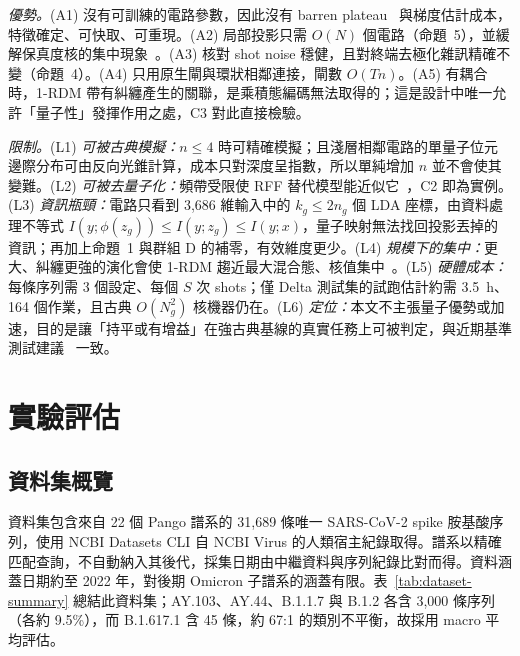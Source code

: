 \documentclass[10pt,a4paper]{article}
\begin{document}
\textit{優勢。}(A1) 沒有可訓練的電路參數，因此沒有 barren plateau~\cite{mcclean2018barren} 與梯度估計成本，特徵確定、可快取、可重現。(A2) 局部投影只需 $O(N)$ 個電路（命題~5），並緩解保真度核的集中現象~\cite{huang2021power}。(A3) 核對 shot noise 穩健，且對終端去極化雜訊精確不變（命題~4）。(A4) 只用原生閘與環狀相鄰連接，閘數 $O(Tn)$。(A5) 有耦合時，1-RDM 帶有糾纏產生的關聯，是乘積態編碼無法取得的；這是設計中唯一允許「量子性」發揮作用之處，C3 對此直接檢驗。

\textit{限制。}(L1) \emph{可被古典模擬：}$n\le4$ 時可精確模擬；且淺層相鄰電路的單量子位元邊際分布可由反向光錐計算，成本只對深度呈指數，所以單純增加 $n$ 並不會使其變難。(L2) \emph{可被去量子化：}頻帶受限使 RFF 替代模型能近似它~\cite{schreiber2023surrogates,sweke2023rff}，C2 即為實例。(L3) \emph{資訊瓶頸：}電路只看到 3,686 維輸入中的 $k_g\le2n_g$ 個 LDA 座標，由資料處理不等式 $I(y;\phi(z_g))\le I(y;z_g)\le I(y;x)$，量子映射無法找回投影丟掉的資訊；再加上命題~1 與群組 D 的補零，有效維度更少。(L4) \emph{規模下的集中：}更大、糾纏更強的演化會使 1-RDM 趨近最大混合態、核值集中~\cite{thanasilp2024concentration}。(L5) \emph{硬體成本：}每條序列需 3 個設定、每個 $S$ 次 shots；僅 Delta 測試集的試跑估計約需 3.5~h、164 個作業，且古典 $O(N_g^2)$ 核機器仍在。(L6) \emph{定位：}本文不主張量子優勢或加速，目的是讓「持平或有增益」在強古典基線的真實任務上可被判定，與近期基準測試建議~\cite{bowles2024better} 一致。

\FloatBarrier
\section{實驗評估}
\label{sec:experiment}

\subsection{資料集概覽}
\label{sec:dataset}

資料集包含來自 22 個 Pango 譜系的 31,689 條唯一 SARS-CoV-2 spike 胺基酸序列，使用 NCBI Datasets CLI 自 NCBI Virus 的人類宿主紀錄取得。譜系以精確匹配查詢，不自動納入其後代，採集日期由中繼資料與序列紀錄比對而得。資料涵蓋日期約至 2022 年，對後期 Omicron 子譜系的涵蓋有限。表~\ref{tab:dataset-summary} 總結此資料集；AY.103、AY.44、B.1.1.7 與 B.1.2 各含 3,000 條序列（各約 9.5\%），而 B.1.617.1 含 45 條，約 67:1 的類別不平衡，故採用 macro 平均評估。
\end{document}
